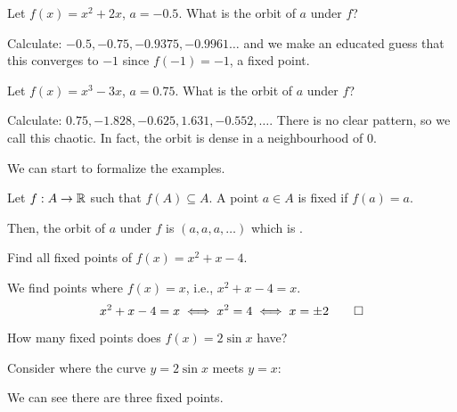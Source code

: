\documentclass[class=pmath370,tikz,notes]{agony}
\begin{document}
\begin{example}
  Let $f(x) = x^2 + 2x$, $a = -0.5$. What is the orbit of $a$ under $f$?
\end{example}
\begin{sol}
  Calculate: $-0.5, -0.75, -0.9375, -0.9961\dots$
  and we make an educated guess that this converges to $-1$
  since $f(-1) = -1$, a fixed point.
\end{sol}

\begin{example}
  Let $f(x) = x^3 - 3x$, $a = 0.75$. What is the orbit of $a$ under $f$?
\end{example}
\begin{sol}
  Calculate: $0.75, -1.828, -0.625, 1.631, -0.552, \dotsc$.
  There is no clear pattern, so we call this chaotic.
  In fact, the orbit is dense in a neighbourhood of 0.
\end{sol}

We can start to formalize the examples.

\begin{defn}
  Let $f : A \to \mathbb{R}$ such that $f(A) \subseteq A$.
  A point $a \in A$ is fixed if $f(a) = a$.

  Then, the orbit of $a$ under $f$ is $(a,a,a,\dotsc)$
  which is .
\end{defn}

\begin{example}
  Find all fixed points of $f(x) = x^2 + x - 4$.
\end{example}
\begin{sol}
  We find points where $f(x) = x$, i.e., $x^2 + x - 4 = x$.
  \begin{equation*}
    x^2 + x - 4 = x \iff x^2 = 4 \iff x = \pm 2 \qedhere
  \end{equation*}
\end{sol}

\begin{example}\label{ex:graph}
  How many fixed points does $f(x) = 2\sin x$ have?
\end{example}
\begin{sol}
  Consider where the curve $y = 2\sin x$ meets $y = x$:
  \begin{center}
  \end{center}
  We can see there are three fixed points.
\end{sol}
\end{document}
